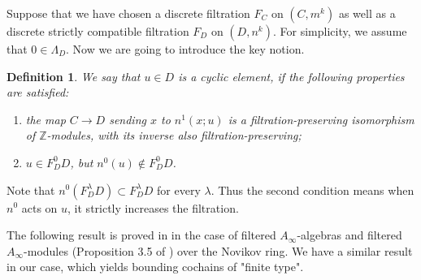 \documentclass{amsart}
\newtheorem{definition}[theorem]{Definition}
\numberwithin{equation}{section}
\numberwithin{figure}{section}
\begin{document}
	Suppose that we have chosen a discrete filtration $F_{C}$ on $(C, m^{k})$ as well as a discrete strictly compatible filtration $F_{D}$ on $(D, n^{k})$. For simplicity, we assume that $0 \in \Lambda_{D}$. Now we are going to introduce the key notion. \par

\begin{definition}
	We say that $u \in D$ is a cyclic element, if the following properties are satisfied:
\begin{enumerate}[label=(\roman*)]

\item the map $C \to D$ sending $x$ to $n^{1}(x; u)$ is a filtration-preserving isomorphism of $\mathbb{Z}$-modules, with its inverse also filtration-preserving;

\item $u \in F_{D}^{0}D$, but $n^{0}(u) \notin F_{D}^{0}D$.

\end{enumerate}

\end{definition}

	Note that $n^{0}(F_{D}^{\lambda}D) \subset F_{D}^{\lambda}D$ for every $\lambda$. Thus the second condition means when $n^{0}$ acts on $u$, it strictly increases the filtration. \par

	The following result is proved in \cite{Fukaya2} in the case of filtered $A_{\infty}$-algebras and filtered $A_{\infty}$-modules (Proposition 3.5 of \cite{Fukaya2}) over the Novikov ring. We have a similar result in our case, which yields bounding cochains of "finite type". \par
\end{document}
